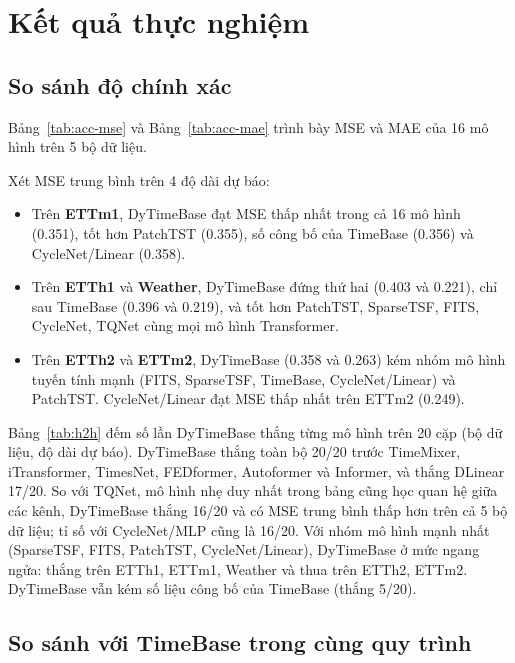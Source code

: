 \documentclass[12pt,a4paper]{report}
\numberwithin{equation}{chapter}
\begin{document}
\section{Kết quả thực nghiệm}

\subsection{So sánh độ chính xác}

Bảng~\ref{tab:acc-mse} và Bảng~\ref{tab:acc-mae} trình bày MSE và MAE của 16 mô hình trên 5 bộ dữ liệu.




Xét MSE trung bình trên 4 độ dài dự báo:
\begin{itemize}
  \item Trên \textbf{ETTm1}, DyTimeBase đạt MSE thấp nhất trong cả 16 mô hình (0.351), tốt hơn PatchTST (0.355), số
        công bố của TimeBase (0.356) và CycleNet/Linear (0.358).
  \item Trên \textbf{ETTh1} và \textbf{Weather}, DyTimeBase đứng thứ hai (0.403 và 0.221), chỉ sau TimeBase (0.396 và
        0.219), và tốt hơn PatchTST, SparseTSF, FITS, CycleNet, TQNet cùng mọi mô hình Transformer.
  \item Trên \textbf{ETTh2} và \textbf{ETTm2}, DyTimeBase (0.358 và 0.263) kém nhóm mô hình tuyến tính mạnh (FITS,
        SparseTSF, TimeBase, CycleNet/Linear) và PatchTST. CycleNet/Linear đạt MSE thấp nhất trên ETTm2 (0.249).
\end{itemize}

Bảng~\ref{tab:h2h} đếm số lần DyTimeBase thắng từng mô hình trên 20 cặp (bộ dữ liệu, độ dài dự báo). DyTimeBase thắng
toàn bộ 20/20 trước TimeMixer, iTransformer, TimesNet, FEDformer, Autoformer và Informer, và thắng DLinear 17/20. So với
TQNet, mô hình nhẹ duy nhất trong bảng cũng học quan hệ giữa các kênh, DyTimeBase thắng 16/20 và có MSE trung bình thấp
hơn trên cả 5 bộ dữ liệu; tỉ số với CycleNet/MLP cũng là 16/20. Với nhóm mô hình mạnh nhất (SparseTSF, FITS, PatchTST,
CycleNet/Linear), DyTimeBase ở mức ngang ngửa: thắng trên ETTh1, ETTm1, Weather và thua trên ETTh2, ETTm2. DyTimeBase vẫn
kém số liệu công bố của TimeBase (thắng 5/20).



\subsection{So sánh với TimeBase trong cùng quy trình}
\end{document}
